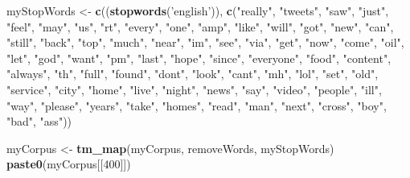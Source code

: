 \documentclass[
]{article}
\newenvironment{Shaded}{\begin{snugshade}}{\end{snugshade}}
\newcommand{\DecValTok}[1]{\textcolor[rgb]{0.00,0.00,0.81}{#1}}
\newcommand{\KeywordTok}[1]{\textcolor[rgb]{0.13,0.29,0.53}{\textbf{#1}}}
\newcommand{\NormalTok}[1]{#1}
\newcommand{\StringTok}[1]{\textcolor[rgb]{0.31,0.60,0.02}{#1}}
\begin{document}
\begin{Shaded}
\begin{Highlighting}[]
\NormalTok{myStopWords <-}\StringTok{ }\KeywordTok{c}\NormalTok{((}\KeywordTok{stopwords}\NormalTok{(}\StringTok{'english'}\NormalTok{)), }
         \KeywordTok{c}\NormalTok{(}\StringTok{"really"}\NormalTok{, }\StringTok{"tweets"}\NormalTok{, }\StringTok{"saw"}\NormalTok{, }\StringTok{"just"}\NormalTok{, }\StringTok{"feel"}\NormalTok{, }\StringTok{"may"}\NormalTok{, }\StringTok{"us"}\NormalTok{, }\StringTok{"rt"}\NormalTok{, }\StringTok{"every"}\NormalTok{, }\StringTok{"one"}\NormalTok{,}
           \StringTok{"amp"}\NormalTok{, }\StringTok{"like"}\NormalTok{, }\StringTok{"will"}\NormalTok{, }\StringTok{"got"}\NormalTok{, }\StringTok{"new"}\NormalTok{, }\StringTok{"can"}\NormalTok{, }\StringTok{"still"}\NormalTok{, }\StringTok{"back"}\NormalTok{, }\StringTok{"top"}\NormalTok{, }\StringTok{"much"}\NormalTok{,}
           \StringTok{"near"}\NormalTok{, }\StringTok{"im"}\NormalTok{, }\StringTok{"see"}\NormalTok{, }\StringTok{"via"}\NormalTok{, }\StringTok{"get"}\NormalTok{, }\StringTok{"now"}\NormalTok{, }\StringTok{"come"}\NormalTok{, }\StringTok{"oil"}\NormalTok{, }\StringTok{"let"}\NormalTok{, }\StringTok{"god"}\NormalTok{, }\StringTok{"want"}\NormalTok{,}
           \StringTok{"pm"}\NormalTok{, }\StringTok{"last"}\NormalTok{, }\StringTok{"hope"}\NormalTok{, }\StringTok{"since"}\NormalTok{, }\StringTok{"everyone"}\NormalTok{, }\StringTok{"food"}\NormalTok{, }\StringTok{"content"}\NormalTok{, }\StringTok{"always"}\NormalTok{, }\StringTok{"th"}\NormalTok{,}
           \StringTok{"full"}\NormalTok{, }\StringTok{"found"}\NormalTok{, }\StringTok{"dont"}\NormalTok{, }\StringTok{"look"}\NormalTok{, }\StringTok{"cant"}\NormalTok{, }\StringTok{"mh"}\NormalTok{, }\StringTok{"lol"}\NormalTok{, }\StringTok{"set"}\NormalTok{, }\StringTok{"old"}\NormalTok{, }\StringTok{"service"}\NormalTok{,}
           \StringTok{"city"}\NormalTok{, }\StringTok{"home"}\NormalTok{, }\StringTok{"live"}\NormalTok{, }\StringTok{"night"}\NormalTok{, }\StringTok{"news"}\NormalTok{, }\StringTok{"say"}\NormalTok{, }\StringTok{"video"}\NormalTok{, }\StringTok{"people"}\NormalTok{, }\StringTok{"ill"}\NormalTok{, }
           \StringTok{"way"}\NormalTok{,  }\StringTok{"please"}\NormalTok{, }\StringTok{"years"}\NormalTok{, }\StringTok{"take"}\NormalTok{, }\StringTok{"homes"}\NormalTok{, }\StringTok{"read"}\NormalTok{, }\StringTok{"man"}\NormalTok{, }\StringTok{"next"}\NormalTok{, }\StringTok{"cross"}\NormalTok{, }
           \StringTok{"boy"}\NormalTok{, }\StringTok{"bad"}\NormalTok{, }\StringTok{"ass"}\NormalTok{))}

\NormalTok{myCorpus <-}\StringTok{ }\KeywordTok{tm_map}\NormalTok{(myCorpus, removeWords, myStopWords) }
\KeywordTok{paste0}\NormalTok{(myCorpus[[}\DecValTok{400}\NormalTok{]])}
\end{Highlighting}
\end{Shaded}
\end{document}
